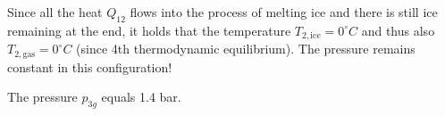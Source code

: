 Since all the heat \(Q_{12}\) flows into the process of melting ice and there is still ice remaining at the end, it holds that the temperature \(T_{2, \text{ice}} = 0^\circ C\) and thus also \(T_{2, \text{gas}} = 0^\circ C\) (since 4th thermodynamic equilibrium). The pressure remains constant in this configuration!

The pressure \( p_{3g} \) equals 1.4 bar.